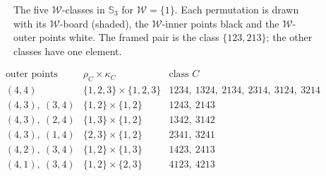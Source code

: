 \documentclass[11pt]{amsart}
\theoremstyle{definition}
\theoremstyle{remark}
\newcommand{\bS}{\mathbb{S}}
\newcommand{\cW}{\mathcal{W}}
\newcommand{\gridlines}[2]{\draw[gray!55,very thin] (0,0) grid (#1,-#2);}
\newcommand{\shaderows}[2][gray!22]{\foreach \x/\y in {#2}{\fill[#1] (0,1-\x) rectangle (\y,-\x);}}
\newcommand{\pt}[2]{\fill (#2-0.5,0.5-#1) circle (0.16);}
\newcommand{\opt}[2]{\draw[semithick,fill=white] (#2-0.5,0.5-#1) circle (0.16);}
\begin{document}
\begin{figure}[ht]
\centering
{}
\caption{The five $\cW$-classes in $\bS_3$ for $\cW=\{1\}$. Each permutation is drawn with its $\cW$-board (shaded), the $\cW$-inner points black and the $\cW$-outer points white. The framed pair is the class $\{123,213\}$; the other classes have one element.}\label{fig:classes3}
\end{figure}

\begin{table}[ht]
\[
\begin{array}{c|c|c}
\text{outer points} & \rho_C\times\kappa_C & \text{class }C\\\hline
(4,4) & \{1,2,3\}\times\{1,2,3\} & 1234,\ 1324,\ 2134,\ 2314,\ 3124,\ 3214\\
(4,3),\ (3,4) & \{1,2\}\times\{1,2\} & 1243,\ 2143\\
(4,3),\ (2,4) & \{1,3\}\times\{1,2\} & 1342,\ 3142\\
(4,3),\ (1,4) & \{2,3\}\times\{1,2\} & 2341,\ 3241\\
(4,2),\ (3,4) & \{1,2\}\times\{1,3\} & 1423,\ 2413\\
(4,1),\ (3,4) & \{1,2\}\times\{2,3\} & 4123,\ 4213
\end{array}
\]
\caption{The $\cW$-classes with more than one element in $\bS_4$ for $\cW=\{1\}$. In each case the board $\lambda_C$ is all of $\rho_C\times\kappa_C$.}\label{tab:classes4}
\end{table}
\end{document}
